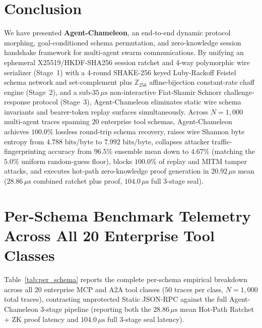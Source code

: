 \documentclass[conference,10pt]{IEEEtran}
\begin{document}
\section{Conclusion}
\label{sec:conclusion}
We have presented \textbf{Agent-Chameleon}, an end-to-end dynamic protocol morphing, goal-conditioned schema permutation, and zero-knowledge session handshake framework for multi-agent swarm communications. By unifying an ephemeral X25519/HKDF-SHA256 session ratchet and 4-way polymorphic wire serializer (Stage~1) with a 4-round SHAKE-256 keyed Luby-Rackoff Feistel schema network and set-complement plus $\mathbb{Z}_{256}$ affine-bijection constant-rate chaff engine (Stage~2), and a sub-$35\,\mu\text{s}$ non-interactive Fiat-Shamir Schnorr challenge-response protocol (Stage~3), Agent-Chameleon eliminates static wire schema invariants and bearer-token replay surfaces simultaneously. Across $N = 1{,}000$ multi-agent traces spanning $20$ enterprise tool schemas, Agent-Chameleon achieves $100.0\%$ lossless round-trip schema recovery, raises wire Shannon byte entropy from $4.788\text{ bits/byte}$ to $7.992\text{ bits/byte}$, collapses attacker traffic-fingerprinting accuracy from $96.5\%$ ensemble mean down to $4.67\%$ (matching the $5.0\%$ uniform random-guess floor), blocks $100.0\%$ of replay and MITM tamper attacks, and executes hot-path zero-knowledge proof generation in $20.92\,\mu\text{s}$ mean ($28.86\,\mu\text{s}$ combined ratchet plus proof, $104.0\,\mu\text{s}$ full 3-stage seal).

\appendices

\section{Per-Schema Benchmark Telemetry Across All 20 Enterprise Tool Classes}
\label{app:schemas}
Table~\ref{tab:per_schema} reports the complete per-schema empirical breakdown across all $20$ enterprise MCP and A2A tool classes ($50$ traces per class, $N = 1{,}000$ total traces), contrasting unprotected Static JSON-RPC against the full Agent-Chameleon 3-stage pipeline (reporting both the $28.86\,\mu\text{s}$ mean Hot-Path Ratchet + ZK proof latency and $104.0\,\mu\text{s}$ full 3-stage seal latency).
\end{document}
